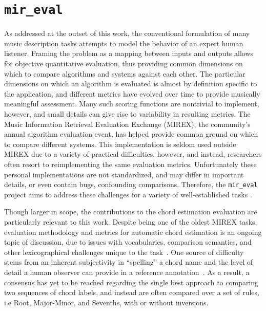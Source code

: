 \section{\texttt{mir\_eval}}
\label{sec:mir_eval}

As addressed at the outset of this work, the conventional formulation of many music description tasks attempts to model the behavior of an expert human listener.
Framing the problem as a mapping between inputs and outputs allows for objective quantitative evaluation, thus providing common dimensions on which to compare algorithms and systems against each other.
The particular dimensions on which an algorithm is evaluated is almost by definition specific to the application, and different metrics have evolved over time to provide musically meaningful assessment.
Many such scoring functions are nontrivial to implement, however, and small details can give rise to variability in resulting metrics.
The Music Information Retrieval Evaluation Exchange (MIREX), the community's annual algorithm evaluation event, has helped provide common ground on which to compare different systems.
This implementation is seldom used outside MIREX due to a variety of practical difficulties, however, and instead, researchers often resort to reimplementing the same evaluation metrics.
Unfortunately these personal implementations are not standardized, and may differ in important details, or even contain bugs, confounding comparisons.
Therefore, the \texttt{mir\_eval} project aims to address these challenges for a variety of well-established tasks \cite{Raffel2014}.


Though larger in scope, the contributions to the chord estimation evaluation are particularly relevant to this work.
Despite being one of the oldest MIREX tasks, evaluation methodology and metrics for automatic chord estimation is an ongoing topic of discussion, due to issues with vocabularies, comparison semantics, and other lexicographical challenges unique to the task~\cite{pauwels2013evaluating}.
One source of difficulty stems from an inherent subjectivity in ``spelling'' a chord name and the level of detail a human observer can provide in a reference annotation~\cite{ni2013understanding}.
As a result, a consensus has yet to be reached regarding the single best approach to comparing two sequences of chord labels, and instead are often compared over a set of rules, i.e Root, Major-Minor, and Sevenths, with or without inversions.

